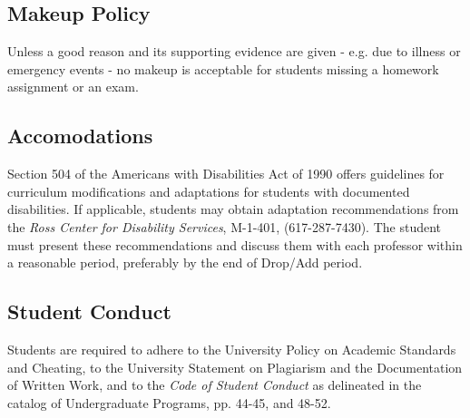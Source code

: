 \documentclass[12pt,letterpaper,twoside]{article}
\begin{document}
\subsection*{Makeup Policy}
Unless a good reason and its supporting evidence are given - e.g. due to illness or emergency events - no makeup is acceptable for students missing a homework assignment or an exam.

\subsection*{Accomodations}
Section 504 of the Americans with Disabilities Act of 1990 offers guidelines for curriculum modifications and adaptations for students with documented disabilities. If applicable, students may obtain adaptation recommendations from the \textit{Ross Center for Disability Services}, M-1-401, (617-287-7430). The student must present these recommendations and discuss them with each professor within a reasonable period, preferably by the end of Drop/Add period.

\subsection*{Student Conduct}
Students are required to adhere to the University Policy on Academic Standards and Cheating, to the University Statement on Plagiarism and the Documentation of Written Work, and to the \textit{Code of Student Conduct} as delineated in the catalog of Undergraduate Programs, pp. 44-45, and 48-52.

\end{document}
